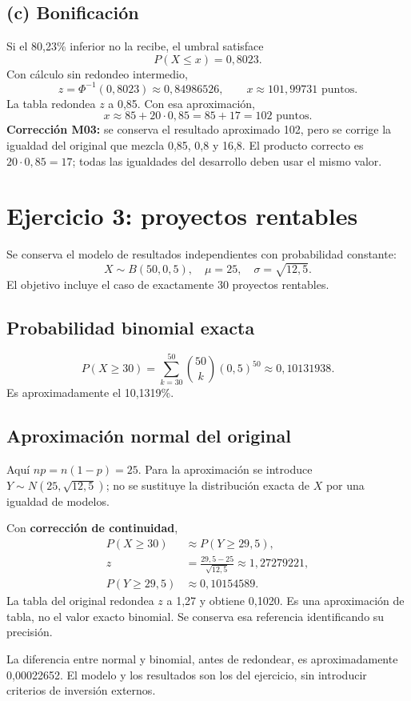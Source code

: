 \documentclass[11pt]{article}
\begin{document}
\subsection*{(c) Bonificación}
Si el 80,23\% inferior no la recibe, el umbral satisface
\[P(X\leq x)=0{,}8023.\]
Con cálculo sin redondeo intermedio,
\[z=\Phi^{-1}(0{,}8023)\approx0{,}84986526,\qquad
\boxed{x\approx101{,}99731\text{ puntos}}.\]
La tabla redondea $z$ a 0,85. Con esa aproximación,
\[x\approx85+20\cdot0{,}85=85+17=\boxed{102\text{ puntos}}.\]
\textbf{Corrección M03:} se conserva el resultado aproximado 102, pero se corrige la igualdad del original que mezcla 0,85, 0,8 y 16,8. El producto correcto es $20\cdot0{,}85=17$; todas las igualdades del desarrollo deben usar el mismo valor.
\clearpage
\section*{Ejercicio 3: proyectos rentables}
Se conserva el modelo de resultados independientes con probabilidad constante:
\[X\sim B(50,0{,}5),\quad\mu=25,\quad\sigma=\sqrt{12{,}5}.\]
El objetivo incluye el caso de exactamente 30 proyectos rentables.
\subsection*{Probabilidad binomial exacta}
\[P(X\geq30)=\sum_{k=30}^{50}\binom{50}{k}(0{,}5)^{50}
\approx\boxed{0{,}10131938}.\]
Es aproximadamente el 10,1319\%.
\subsection*{Aproximación normal del original}
Aquí $np=n(1-p)=25$. Para la aproximación se introduce $Y\sim N(25,\sqrt{12{,}5})$; no se sustituye la distribución exacta de $X$ por una igualdad de modelos.

Con \textbf{corrección de continuidad},
\begin{align*}
P(X\geq30)&\approx P(Y\geq29{,}5),\\
z&=\frac{29{,}5-25}{\sqrt{12{,}5}}\approx1{,}27279221,\\
P(Y\geq29{,}5)&\approx\boxed{0{,}10154589}.
\end{align*}
La tabla del original redondea $z$ a 1,27 y obtiene 0,1020. Es una aproximación de tabla, no el valor exacto binomial. Se conserva esa referencia identificando su precisión.

La diferencia entre normal y binomial, antes de redondear, es aproximadamente 0,00022652. El modelo y los resultados son los del ejercicio, sin introducir criterios de inversión externos.
\end{document}
